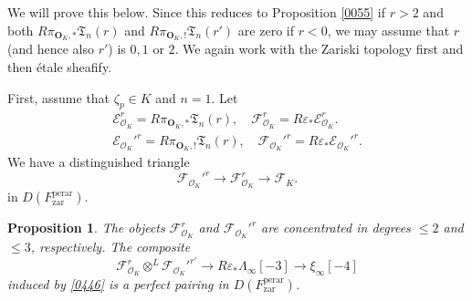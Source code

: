 \documentclass{amsart}
\newtheorem{Prop}[Thm]{Proposition}
\theoremstyle{remark}
\numberwithin{equation}{subsection}
\newcommand{\Order}{\mathcal{O}}
\newcommand{\tensor}{\mathbin{\otimes}}
\newcommand{\zar}{\mathrm{zar}}
\newcommand{\perar}{\mathrm{perar}}
\newcommand{\alg}[1]{\mathbf{#1}}
\begin{document}
We will prove this below.
Since this reduces to Proposition \ref{0055} if $r > 2$
and both $R \pi_{\alg{O}_{K}, \ast} \mathfrak{T}_{n}(r)$
and $R \pi_{\alg{O}_{K}, !} \mathfrak{T}_{n}(r')$ are zero if $r < 0$,
we may assume that $r$ (and hence also $r'$) is $0, 1$ or $2$.
We again work with the Zariski topology first and then \'etale sheafify.

First, assume that $\zeta_{p} \in K$ and $n = 1$.
Let
	\begin{gather*}
				\mathcal{E}_{\Order_{K}}^{r}
			=
				R \pi_{\alg{O}_{K}, \ast} \mathfrak{T}_{n}(r),
		\quad
				\mathcal{F}_{\Order_{K}}^{r}
			=
				R \varepsilon_{\ast}
				\mathcal{E}_{\Order_{K}}^{r}.
		\\
				\mathcal{E}_{\Order_{K}}'^{r}
			=
				R \pi_{\alg{O}_{K}, !} \mathfrak{T}_{n}(r),
		\quad
				\mathcal{F}_{\Order_{K}}'^{r}
			=
				R \varepsilon_{\ast}
				\mathcal{E}_{\Order_{K}}'^{r}.
	\end{gather*}
We have a distinguished triangle
	\[
			\mathcal{F}_{\Order_{K}}'^{r}
		\to
			\mathcal{F}_{\Order_{K}}^{r}
		\to
			\mathcal{F}_{K}.
	\]
in $D(F^{\perar}_{\zar})$.

\begin{Prop} \label{0448}
	The objects $\mathcal{F}_{\Order_{K}}^{r}$ and $\mathcal{F}_{\Order_{K}}'^{r}$
	are concentrated in degrees $\le 2$ and $\le 3$, respectively.
	The composite
		\[
					\mathcal{F}_{\Order_{K}}^{r}
				\tensor^{L}
					\mathcal{F}_{\Order_{K}}'^{r'}
			\to
				R \varepsilon_{\ast} \Lambda_{\infty}[-3]
			\to
				\xi_{\infty}[-4]
		\]
	induced by \eqref{0446} is a perfect pairing in $D(F^{\perar}_{\zar})$.
\end{Prop}
\end{document}
